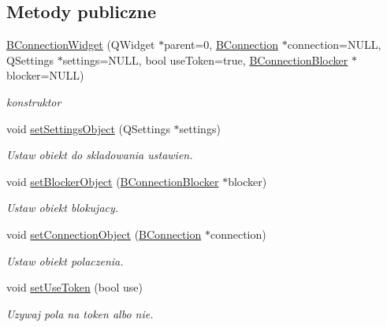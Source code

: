 \subsection*{Metody publiczne}
\begin{DoxyCompactItemize}
\item 
\hyperlink{class_b_connection_widget_af549f688fe132260b6a1333cde59dba7}{BConnectionWidget} (QWidget $\ast$parent=0, \hyperlink{class_b_connection}{BConnection} $\ast$connection=NULL, QSettings $\ast$settings=NULL, bool useToken=true, \hyperlink{class_b_connection_blocker}{BConnectionBlocker} $\ast$blocker=NULL)
\begin{DoxyCompactList}\small\item\em konstruktor \item\end{DoxyCompactList}\item 
void \hyperlink{class_b_connection_widget_a45070066f5da8af537f422d8b37c7d6e}{setSettingsObject} (QSettings $\ast$settings)
\begin{DoxyCompactList}\small\item\em Ustaw obiekt do skladowania ustawien. \item\end{DoxyCompactList}\item 
void \hyperlink{class_b_connection_widget_a976657d9910495a76d16b7c90d0b54fc}{setBlockerObject} (\hyperlink{class_b_connection_blocker}{BConnectionBlocker} $\ast$blocker)
\begin{DoxyCompactList}\small\item\em Ustaw obiekt blokujacy. \item\end{DoxyCompactList}\item 
void \hyperlink{class_b_connection_widget_a476033357eea69f9ef4a7f4235a97556}{setConnectionObject} (\hyperlink{class_b_connection}{BConnection} $\ast$connection)
\begin{DoxyCompactList}\small\item\em Ustaw obiekt polaczenia. \item\end{DoxyCompactList}\item 
void \hyperlink{class_b_connection_widget_a80d71ca868172dc623b9fa6c1ab938a6}{setUseToken} (bool use)
\begin{DoxyCompactList}\small\item\em Uzywaj pola na token albo nie. \item\end{DoxyCompactList}\end{DoxyCompactItemize}
